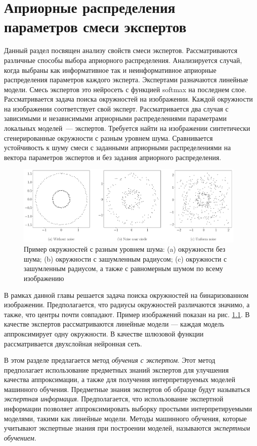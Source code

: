 \chapter{Априорные распределения параметров смеси экспертов}

Данный раздел посвящен анализу свойств смеси экспертов. Рассматриваются различные способы выбора априорного распределения. Анализируется случай, когда выбраны как информативное так и неинформативное априорные распределения параметров каждого эксперта. Экспертами разначаются линейные модели. Смесь экспертов это нейросеть с функцией softmax на последнем слое. Рассматривается задача поиска окружностей на изображении. Каждой окружности на изображении соответствует свой эксперт. Рассматривается два случая с зависимыми и независимыми априорными распределениями параметрами локальных моделей~--- экспертов. Требуется найти на изображении синтетически сгенерированные окружности с разным уровнем шума. Сравнивается устойчивость к шуму смеси с заданными априорными распределениями на вектора параметров экспертов и без задания априорного распределения.

\begin{figure}[h!t]\center
\includegraphics[width=1\textwidth]{results/priorexpert/statment}
\caption{Пример окружностей с разным уровнем шума: (a) окружности без шума; (b) окружности с зашумленным радиусом; (c) окружности с зашумленным радиусом, а также с равномерным шумом по всему изображению}
\label{example-exp:1}
\end{figure}

В рамках данной главы решается задача поиска окружностей на бинаризованном изображении. Предполагается, что радиусы окружностей различаются значимо, а также, что центры почти совпадают. Пример изображений показан на рис. \ref{example-exp:1}. В качестве экспертов рассматриваются линейные модели --- каждая модель аппроксимирует одну окружности. В качестве шлюзовой функции рассматривается двухслойная нейронная сеть.

В этом разделе предлагается метод \textit{обучения с экспертом}.
Этот метод предполагает использование предметных знаний экспертов для улучшения качества аппроксимации, а также для получения интерпретируемых моделей машинного обучения.
Предметные знания экспертов об образце будут называться \textit{экспертная информация}.
Предполагается, что использование экспертной информации позволяет аппроксимировать выборку простыми интерпретируемыми моделями, такими как линейные модели. Методы машинного обучения, которые учитывают экспертные знания при построении моделей, называются \textit{экспертным обучением}.

